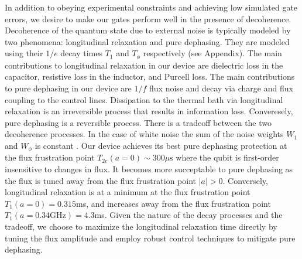 \documentclass[
  amsfonts,
  amsmath,
  tbtags,
  amssymb,
  aps,
  nobibnotes,
  twocolumn,
  superscriptaddress,
]{revtex4-2}
\begin{document}
In addition to obeying experimental constraints
and achieving low simulated gate errors, we desire
to make our gates perform well in the presence of decoherence.
Decoherence of the quantum state due to external noise
is typically modeled by two phenomena: longitudinal relaxation and pure dephasing.
They are modeled using their $1/e$ decay times $T_{1}$ and $T_{\phi}$ respectively
(see Appendix).
The main contributions to longitudinal relaxation in our
device are dielectric loss in the capacitor, resistive loss in the inductor,
and Purcell loss. The main contributions to pure dephasing in our
device are $1/f$ flux noise and decay via charge and flux coupling
to the control lines.
Dissipation to the thermal bath via longitudinal
relaxation is an irreversible process
that results in information loss.
Converesely, pure dephasing is a reversible process.
There is a tradeoff between the two decoherence processes. In the case of white
noise the sum of the noise weights $W_{1}$ and $W_{\phi}$
is constant \cite{huang2020engineering}.
Our device achieves its best pure dephasing
protection at the flux frustration point
$T_{2e}(a = 0) \sim 300 \mu\textrm{s}$
where the qubit is first-order insensitive to changes in flux.
It becomes more succeptable to pure dephasing as the flux is tuned away from the flux
frustration point $|a| > 0$. Conversely, longitudinal relaxation is at a minimum
at the flux frustration point $T_{1}(a = 0) = 0.315$ms,
and increases away from the flux frustration point
$T_{1}(a = 0.34 \textrm{GHz}) = 4.3$ms. Given the nature
of the decay processes and the tradeoff, we choose
to maximize the longitudinal relaxation time directly
by tuning the flux amplitude and employ robust control techniques to mitigate
pure dephasing.

\end{document}
